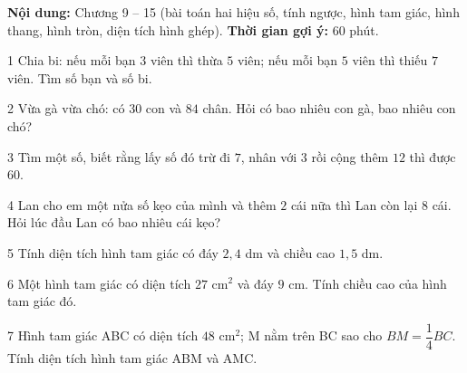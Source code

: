 \begin{knowbox}
\textbf{Nội dung:} Chương 9 -- 15 (bài toán hai hiệu số, tính ngược, hình tam giác, hình thang, hình tròn, diện tích hình ghép). \quad \textbf{Thời gian gợi ý:} $60$ phút.
\end{knowbox}
\gap
\begin{probbox}{1}{\relax}
Chia bi: nếu mỗi bạn $3$ viên thì thừa $5$ viên; nếu mỗi bạn $5$ viên thì thiếu $7$ viên. Tìm số bạn và số bi.
\end{probbox}
\gap
\begin{probbox}{2}{\relax}
Vừa gà vừa chó: có $30$ con và $84$ chân. Hỏi có bao nhiêu con gà, bao nhiêu con chó?
\end{probbox}
\gap
\begin{probbox}{3}{\relax}
Tìm một số, biết rằng lấy số đó trừ đi $7$, nhân với $3$ rồi cộng thêm $12$ thì được $60$.
\end{probbox}
\gap
\begin{probbox}{4}{\relax}
Lan cho em một nửa số kẹo của mình và thêm $2$ cái nữa thì Lan còn lại $8$ cái. Hỏi lúc đầu Lan có bao nhiêu cái kẹo?
\end{probbox}
\gap
\begin{probbox}{5}{\relax}
Tính diện tích hình tam giác có đáy $2{,}4$ dm và chiều cao $1{,}5$ dm.
\end{probbox}
\gap
\begin{probbox}{6}{\relax}
Một hình tam giác có diện tích $27$ cm$^2$ và đáy $9$ cm. Tính chiều cao của hình tam giác đó.
\end{probbox}
\gap
\begin{probbox}{7}{\relax}
Hình tam giác ABC có diện tích $48$ cm$^2$; M nằm trên BC sao cho $BM=\dfrac14BC$. Tính diện tích hình tam giác ABM và AMC.
\end{probbox}
